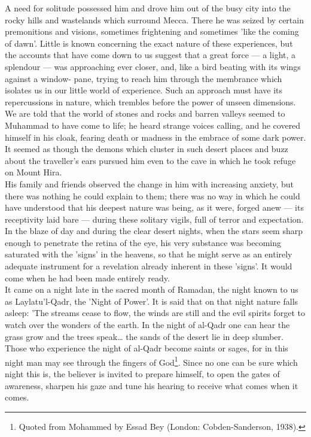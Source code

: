 \documentclass[11pt, b5paper, twoside]{book}
\begin{document}
A need for solitude possessed him and drove him out of the busy city into the rocky hills and 
wastelands which surround Mecca. There he was seized by certain premonitions and visions, sometimes 
frightening and sometimes 'like the coming of dawn'. Little is known concerning the exact nature of 
these experiences, but the accounts that have come down to us suggest that a great force --- a light, a 
splendour --- was approaching ever closer, and, like a bird beating with its wings against a window-
pane, trying to reach him through the membrance which isolates us in our little world of experience. 
Such an approach must have its repercussions in nature, which trembles before the power of unseen 
dimensions. We are told that the world of stones and rocks and barren valleys seemed to Muhammad to 
have come to life; he heard strange voices calling, and he covered himself in his cloak, fearing 
death or madness in the embrace of some dark power. It seemed as though the demons which cluster in 
such desert places and buzz about the traveller's ears pursued him even to the cave in which he took 
refuge on Mount Hira. \\

His family and friends observed the change in him with increasing anxiety, but there was nothing he 
could explain to them; there was no way in which he could have understood that his deepest nature was 
being, as it were, forged anew --- its receptivity laid bare --- during these solitary vigils, full of 
terror and expectation. In the blaze of day and during the clear desert nights, when the stars seem 
sharp enough to penetrate the retina of the eye, his very substance was becoming saturated with the 
'signs' in the heavens, so that he might serve as an entirely adequate instrument for a revelation 
already inherent in these 'signs'. It would come when he had been made entirely ready. \\

It came on a night late in the sacred month of Ramadan, the night known to us as Laylatu'l-Qadr, the 
'Night of Power'. It is said that on that night nature falls asleep: 'The streams cease to flow, the 
winds are still and the evil spirits forget to watch over the wonders of the earth. In the night of 
al-Qadr one can hear the grass grow and the trees speak\ldots{} the sands of the desert lie in deep 
slumber. Those who experience the night of al-Qadr become saints or sages, for in this night man may 
see through the fingers of God\footnote{Quoted from Mohammed by Essad Bey (London: Cobden-Sanderson, 1938).}. Since no one can be sure which night this is, the believer is 
invited to prepare himself, to open the gates of awareness, sharpen his gaze and tune his hearing to 
receive what comes when it comes. \\
\end{document}
